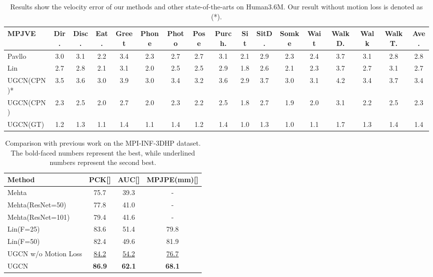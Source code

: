 \documentclass[runningheads]{llncs}
\begin{document}
\begin{table}
    \tiny
    \setlength{\tabcolsep}{0.2em}
    \centering
    \caption {Results show the velocity error of our methods and other state-of-the-arts on Human3.6M.
Our result without motion loss is denoted as (*).}
    \label{tab: h35m sota 3}
    \begin{tabular}[width=0.9\linewidth]{@{}l| ccccccccccccccc |c   @{}}
    \toprule
    MPJVE & Dir. & Disc. & Eat. & Greet   & Phone & Photo & Pose & Purch. & Sit   & SitD. & Somke & Wait & WalkD.  & Walk & WalkT. & Ave. \\
    \midrule
    Pavllo~\cite{pavllo20193d} & 3.0& 3.1& 2.2& 3.4& 2.3& 2.7& 2.7& 3.1& 2.1& 2.9& 2.3& 2.4& 3.7& 3.1& 2.8& 2.8 \\
    Lin~\cite{lin2019trajectory} & 2.7 & 2.8 & 2.1 & 3.1 & 2.0 & 2.5 & 2.5 & 2.9 & 1.8 & 2.6 & 2.1 & 2.3 & 3.7 & 2.7 & 3.1 & 2.7 \\
    \midrule
    UGCN(CPN)*& 3.5 & 3.6 & 3.0 & 3.9 & 3.0 & 3.4 & 3.2 & 3.6 & 2.9 & 3.7  & 3.0 & 3.1 & 4.2 & 3.4 & 3.7 & 3.4 \\
    UGCN(CPN)& 2.3 & 2.5 & 2.0 & 2.7 & 2.0 & 2.3 & 2.2 & 2.5 & 1.8 & 2.7 & 1.9 & 2.0 & 3.1 & 2.2 & 2.5 & 2.3 \\
    UGCN(GT) & 1.2 & 1.3 & 1.1 & 1.4 & 1.1 & 1.4 & 1.2 & 1.4 & 1.0 & 1.3 & 1.0 & 1.1 & 1.7 & 1.3 & 1.4 & 1.4\\
    \bottomrule
    \end{tabular}
\end{table}
\begin{table}
    \scriptsize
    \setlength{\tabcolsep}{1.3em}
    \centering
    \caption {Comparison with previous work on the MPI-INF-3DHP dataset. The bold-faced
    numbers represent the best, while underlined numbers represent
    the second best.}
    \label{tab: mpii3}
    \begin{tabular}{@{}l|ccc@{}}
    \toprule
    Method & PCK[] & AUC[] & MPJPE(mm)[] \\
    \midrule
    Mehta~\cite{mehta2017monocular} & 75.7 & 39.3 & - \\
    Mehta(ResNet=50)~\cite{mehta2017vnect} & 77.8 & 41.0 & - \\
    Mehta(ResNet=101)~\cite{mehta2017vnect} & 79.4 & 41.6 & - \\
    Lin(F=25)~\cite{lin2019trajectory} & 83.6 & 51.4 & 79.8 \\
    Lin(F=50)~\cite{lin2019trajectory} & 82.4 & 49.6 & 81.9 \\
    \midrule
    UGCN w/o Motion Loss & \underline{84.2} & \underline{54.2} & \underline{76.7}\\
    UGCN & \textbf{86.9} & \textbf{62.1} & \textbf{68.1} \\
    \bottomrule
    \end{tabular}
\end{table}
\end{document}
